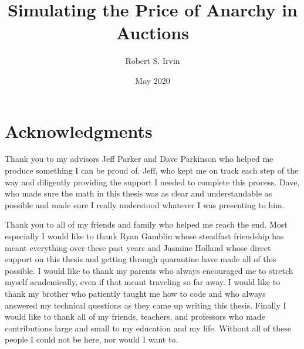 \documentclass[12pt,twoside]{reedthesis}
\title{Simulating the Price of Anarchy in Auctions}
\author{Robert S. Irvin}
\date{May 2020}
\begin{document}
  \maketitle
  \frontmatter %
  \pagestyle{empty} %

    \chapter*{Acknowledgments}
    
    Thank you to my advisors Jeff Parker and Dave Parkinson who helped me produce something I can be proud of. Jeff, who kept me on track each step of the way and diligently providing the support I needed to complete this process. Dave, who made sure the math in this thesis was as clear and understandable as possible and made sure I really understood whatever I was presenting to him.
    
	Thank you to all of my friends and family who helped me reach the end. Most especially I would like to thank Ryan Gamblin whose steadfast friendship has meant everything over these past years and Jasmine Holland whose direct support on this thesis and getting through quarantine have made all of this possible. I would like to thank my parents who always encouraged me to stretch myself academically, even if that meant traveling so far away. I would like to thank my brother who patiently taught me how to code and who always answered my technical questions as they came up writing this thesis. Finally I would like to thank all of my friends, teachers, and professors who made contributions large and small to my education and my life. Without all of these people I could not be here, nor would I want to.

	
\end{document}
